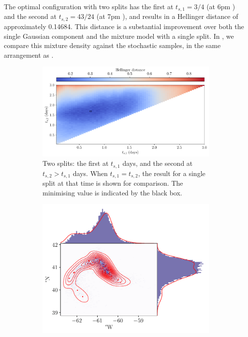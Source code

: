 The optimal configuration with two splits has the first at \(t_{s,1} = 3/4\) (at 6pm ) and the second at \(t_{s,2} = 43/24\) (at 7pm ), and results in a Hellinger distance of approximately 0.14684.
This distance is a substantial improvement over both the single Gaussian component and the mixture model with a single split.
In , we compare this mixture density against the stochastic samples, in the same arrangement as .

\begin{figure}
	\begin{center}
		\begin{subfigure}{\textwidth}
			\includegraphics[width=\textwidth]{chp06_applications/figures/gulf_stream/hell_dist_2split}
			\caption{Two splits: the first at \(t_{s,1}\) days, and the second at \(t_{s,2} > t_{s,1}\) days.
				When \(t_{s,1} = t_{s,2}\), the result for a single split at that time is shown for comparison.
				The minimising value is indicated by the black box.}
			\label{fig:na_2split_hell}
		\end{subfigure}
		\begin{subfigure}{\textwidth}
			\includegraphics[width=\textwidth]{chp06_applications/figures/gulf_stream/gmm_2split_best}

\end{subfigure}
\end{center}
\end{figure}
